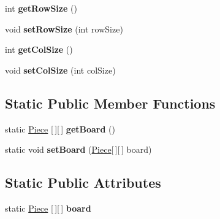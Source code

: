 \begin{DoxyCompactItemize}
\item 
\mbox{\label{classcom_1_1chess_1_1logic_1_1_board_a5d99699e0cdc822274f5b926f66c68cc}} 
int {\bfseries get\+Row\+Size} ()
\item 
\mbox{\label{classcom_1_1chess_1_1logic_1_1_board_a7c050dfa24d4503cca3fea7b106e5388}} 
void {\bfseries set\+Row\+Size} (int row\+Size)
\item 
\mbox{\label{classcom_1_1chess_1_1logic_1_1_board_abb3d513ac2a01029695d91e8a32bf9c9}} 
int {\bfseries get\+Col\+Size} ()
\item 
\mbox{\label{classcom_1_1chess_1_1logic_1_1_board_a52f69770b561d679d5319135b81f974a}} 
void {\bfseries set\+Col\+Size} (int col\+Size)
\end{DoxyCompactItemize}
\subsection*{Static Public Member Functions}
\begin{DoxyCompactItemize}
\item 
\mbox{\label{classcom_1_1chess_1_1logic_1_1_board_a0ad3b40520ad37bdde416dbdb6552c25}} 
static \mbox{\hyperlink{classcom_1_1chess_1_1pieces_1_1_piece}{Piece}} \mbox{[}$\,$\mbox{]}\mbox{[}$\,$\mbox{]} {\bfseries get\+Board} ()
\item 
\mbox{\label{classcom_1_1chess_1_1logic_1_1_board_a5c7b7fee74455848723b8cb32d0ec784}} 
static void {\bfseries set\+Board} (\mbox{\hyperlink{classcom_1_1chess_1_1pieces_1_1_piece}{Piece}}\mbox{[}$\,$\mbox{]}\mbox{[}$\,$\mbox{]} board)
\end{DoxyCompactItemize}
\subsection*{Static Public Attributes}
\begin{DoxyCompactItemize}
\item 
\mbox{\label{classcom_1_1chess_1_1logic_1_1_board_a5469364de89e8380907401feec5601bc}} 
static \mbox{\hyperlink{classcom_1_1chess_1_1pieces_1_1_piece}{Piece}} \mbox{[}$\,$\mbox{]}\mbox{[}$\,$\mbox{]} {\bfseries board}
\end{DoxyCompactItemize}


